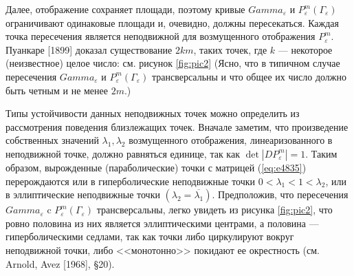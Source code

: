 \documentclass[twoside, a4paper]{article}
\begin{document}
Далее, отображение сохраняет площади, поэтому кривые $Gamma_\varepsilon$ и $P^m_\varepsilon(\Gamma_\varepsilon)$ ограничивают одинаковые площади и, очевидно, должны пересекаться. Каждая точка пересечения является неподвижной для возмущенного отображения $P^m_\varepsilon$. Пуанкаре [1899] доказал существование $2km$, таких точек, где $k$ — некоторое (неизвестное) целое число: см. рисунок \ref{fig:pic2} (Ясно, что в типичном случае пересечения  $Gamma_\varepsilon$ и $P^m_\varepsilon(\Gamma_\varepsilon)$ трансверсальны и что общее их число должно быть четным и не менее $2m$.)

Типы устойчивости данных неподвижных точек можно определить из рассмотрения поведения близлежащих точек. Вначале заметим, что произведение собственных значений $\lambda_1, \lambda_2$ возмущенного отображения, линеаризованного в неподвижной точке, должно равняться единице, так как $\det{|DP^m_\varepsilon|} = 1$. Таким образом, вырожденные (параболические) точки с матрицей (\ref{eq:e4835}) перерождаются или в гиперболические неподвижные точки $0<\lambda_1<1<\lambda_2$, или в эллиптические неподвижные точки $(\lambda_2=\overline{\lambda_1})$. Предположив, что пересечения $Gamma_\varepsilon$ c $P^m_\varepsilon(\Gamma_\varepsilon)$ трансверсальны, легко увидеть из рисунка \ref{fig:pic2}, что ровно половина из них является эллиптическими центрами, а половина --- гиперболическими седлами, так как точки либо циркулируют вокруг неподвижной точки, либо <<монотонно>> покидают ее окрестность (см. Arnold, Avez [1968], \S 20).

\end{document}
